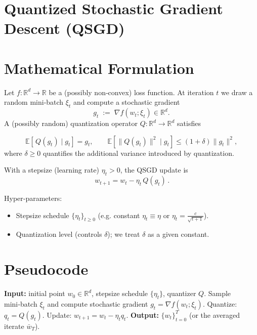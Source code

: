\documentclass{article}
\begin{document}
\section*{Quantized Stochastic Gradient Descent (QSGD)}

\section*{Mathematical Formulation}
Let $f:\mathbb{R}^d\rightarrow\mathbb{R}$ be a (possibly non‑convex) loss function.  
At iteration $t$ we draw a random mini‑batch $\xi_t$ and compute a stochastic gradient
\[
g_t \;:=\; \nabla f(w_t;\xi_t)\in\mathbb{R}^d .
\]
A (possibly random) quantization operator $Q:\mathbb{R}^d\rightarrow\mathbb{R}^d$ satisfies  

\[
\mathbb{E}\!\left[\,Q(g_t)\mid g_t\right]=g_t ,\qquad 
\mathbb{E}\!\left[\|Q(g_t)\|^2\mid g_t\right]\le (1+\delta)\|g_t\|^2,
\tag{1}
\]
where $\delta\ge0$ quantifies the additional variance introduced by quantization.  

With a stepsize (learning rate) $\eta_t>0$, the QSGD update is
\[
\boxed{\,w_{t+1}=w_t-\eta_t\,Q(g_t)\,}. \tag{2}
\]

Hyper‑parameters:
\begin{itemize}
    \item Stepsize schedule $\{\eta_t\}_{t\ge0}$ (e.g. constant $\eta_t\equiv\eta$ or $\eta_t=\frac{c}{\sqrt{t+1}}$).
    \item Quantization level (controls $\delta$); we treat $\delta$ as a given constant.
\end{itemize}

\section*{Pseudocode}
\begin{algorithm}[H]
\caption{Quantized Stochastic Gradient Descent}
\begin{algorithmic}[1]
\STATE \textbf{Input:} initial point $w_0\in\mathbb{R}^d$, stepsize schedule $\{\eta_t\}$, quantizer $Q$.
    \STATE Sample mini‑batch $\xi_t$ and compute stochastic gradient $g_t=\nabla f(w_t;\xi_t)$.
    \STATE Quantize: $q_t = Q(g_t)$.
    \STATE Update: $w_{t+1}= w_t - \eta_t q_t$.
\ENDFOR
\STATE \textbf{Output:} $\{w_t\}_{t=0}^{T}$ (or the averaged iterate $\bar w_T$).
\end{algorithmic}
\end{algorithm}
\end{document}
